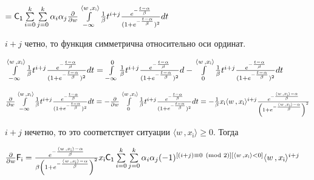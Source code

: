 \documentclass[a4paper,12pt]{article}
\begin{document}
\begin{center}
    $= \mathsf{C_1} \sum\limits_{i = 0}^k \sum\limits_{j = 0}^k \alpha_i \alpha_j {\partial\over{\partial w}} \int\limits_{-\infty}^{\langle w \,, x_{\mathsf{i}}\rangle} {1\over{\beta}} t^{i + j} {e^{-{t - \alpha\over{\beta}}}\over{(1 + e^{-{t - \alpha\over{\beta}}}})^2} d t$
\end{center}

 $i + j$ четно, то функция симметрична относительно оси ординат.

\begin{center}
    $\int\limits_{-\infty}^{\langle w \,, x_{\mathsf{i}}\rangle} {1\over{\beta}} t^{i + j} {e^{-{t - \alpha\over{\beta}}}\over{(1 + e^{-{t - \alpha\over{\beta}}}})^2} d t =
    \int\limits_{-\infty}^{0} {1\over{\beta}} t^{i + j} {e^{-{t - \alpha\over{\beta}}}\over{(1 + e^{-{t - \alpha\over{\beta}}}})^2} d - \int\limits_{0}^{\langle w \,, x_{\mathsf{i}}\rangle} {1\over{\beta}} t^{i + j} {e^{-{t - \alpha\over{\beta}}}\over{(1 + e^{-{t - \alpha\over{\beta}}}})^2} d t$
\end{center}

\begin{center}
    ${\partial\over{\partial w}}\int\limits_{-\infty}^{\langle w \,, x_{\mathsf{i}}\rangle} {1\over{\beta}} t^{i + j} {e^{-{t - \alpha\over{\beta}}}\over{(1 + e^{-{t - \alpha\over{\beta}}}})^2} d t = - {\partial\over{\partial w}}\int\limits_{0}^{\langle w \,, x_{\mathsf{i}}\rangle} {1\over{\beta}} t^{i + j} {e^{-{t - \alpha\over{\beta}}}\over{(1 + e^{-{t - \alpha\over{\beta}}}})^2} d t = -{1\over{\beta}}x_{\mathsf{i}}\langle w \,, x_{\mathsf{i}}\rangle^{i + j} {e^{-{\langle w \,, x_{\mathsf{i}}\rangle - \alpha\over{\beta}}}\over{\left(1 + e^{-{\langle w \,, x_{\mathsf{i}}\rangle - \alpha\over{\beta}}}\right)^2}}$
\end{center}

 $i + j$ нечетно, то это соответствует ситуации $\langle w \,, x_{\mathsf{i}}\rangle \geq{0}$. Тогда

\begin{center}
    ${\partial\over{\partial w}} \mathsf{F_i} = {e^{-{\langle w \,, x_{\mathsf{i}}\rangle - \alpha\over{\beta}}}\over{\beta\left(1 + e^{-{\langle w \,, x_{\mathsf{i}}\rangle - \alpha\over{\beta}}}\right)^2}}x_{\mathsf{i}}\mathsf{C_1} \sum\limits_{i = 0}^k \sum\limits_{j = 0}^k \alpha_i \alpha_j  (-1)^{[(i + j) \equiv 0 \pmod{2}][\langle w \,, x_{\mathsf{i}}\rangle < 0]} \langle w \,, x_{\mathsf{i}}\rangle^{i + j}$
\end{center}
\end{document}
